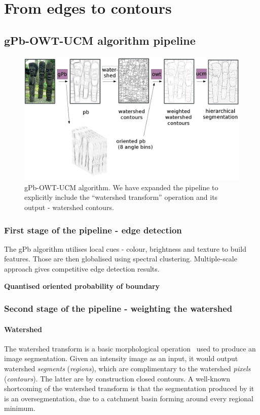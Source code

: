 \chapter{From edges to contours} %
\label{Chapter3}
\section{gPb-OWT-UCM algorithm pipeline}


\begin{figure}[ht!]
\centering
 \includegraphics[width=1\textwidth]{images/gPb-OWT-UCM/gPb-OWT-UCM_pipeline.png}
\caption{gPb-OWT-UCM algorithm. We have expanded the pipeline to explicitly include the ``watershed transform'' operation and its output - watershed contours.}
\label{fig:gPb-OWT-UCM-pipeline}
\end{figure}

\subsection{First stage of the pipeline - edge detection} %
The gPb algorithm utilises local cues - colour, brightness and texture to build features. Those are then globalised using spectral clustering. Multiple-scale approach gives competitive edge detection results.

\textbf{Quantised oriented probability of boundary}
\subsection{Second stage of the pipeline - weighting the watershed} %
\subsubsection{Watershed}
\label{sec:ch3-watershed}
The watershed transform is a basic morphological operation~\cite{beucher1992morphological} used to produce an image segmentation. Given an intensity %
image as an input, it would output watershed \textit{segments} (\textit{regions}), which are complimentary to the watershed \textit{pixels} (\textit{contours}). The latter are by construction closed contours. A well-known shortcoming of the watershed transform is that the 
segmentation produced by it is an oversegmentation, due to a catchment basin forming around every regional minimum.

